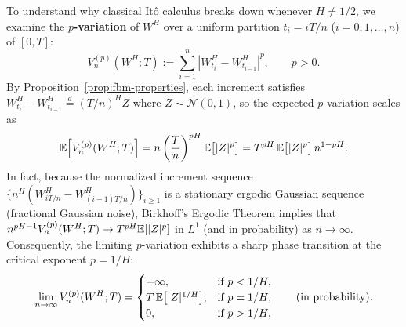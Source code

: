 To understand why classical It\^o calculus breaks down whenever $H \neq 1/2$, we examine the \textbf{$p$-variation} of $W^H$ over a uniform partition $t_i = i T / n$ ($i = 0, 1, \dots, n$) of $[0, T]$:
\[
V_n^{(p)}(W^H; T) := \sum_{i=1}^{n} \left|W_{t_i}^H - W_{t_{i-1}}^H\right|^p, \qquad p > 0.
\]
By Proposition~\ref{prop:fbm-properties}, each increment satisfies $W_{t_i}^H - W_{t_{i-1}}^H \stackrel{d}{=} (T/n)^H Z$ where $Z \sim \mathcal{N}(0, 1)$, so the expected $p$-variation scales as
\[
\mathbb{E}\!\left[V_n^{(p)}(W^H; T)\right] = n\left(\frac{T}{n}\right)^{pH}\mathbb{E}\big[|Z|^p\big] = T^{pH}\,\mathbb{E}\big[|Z|^p\big]\, n^{1 - pH}.
\]
In fact, because the normalized increment sequence $\big\{n^H(W_{iT/n}^H - W_{(i-1)T/n}^H)\big\}_{i \ge 1}$ is a stationary ergodic Gaussian sequence (fractional Gaussian noise), Birkhoff's Ergodic Theorem implies that $n^{pH - 1} V_n^{(p)}(W^H; T) \to T^{pH}\mathbb{E}[|Z|^p]$ in $L^1$ (and in probability) as $n \to \infty$. Consequently, the limiting $p$-variation exhibits a sharp phase transition at the critical exponent $p = 1/H$:
\begin{equation}
\label{eq:fbm-p-variation}
\lim_{n \to \infty} V_n^{(p)}(W^H; T) =
\begin{cases}
    +\infty, & \text{if } p < 1/H, \\
    T\,\mathbb{E}\big[|Z|^{1/H}\big], & \text{if } p = 1/H, \\
    0, & \text{if } p > 1/H,
\end{cases}
\qquad \text{(in probability)}.
\end{equation}

